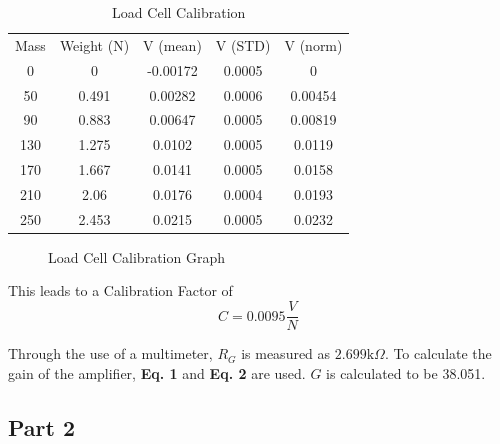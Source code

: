 \documentclass{article}
\begin{document}
\begin{table}
    \centering
    \begin{tabular}{ccccc}
         Mass&  Weight (N)&  V (mean)&  V (STD)&  V (norm)   \\
         0&  0&  -0.00172&  0.0005&  0   \\
         50&  0.491&  0.00282&  0.0006&  0.00454   \\
         90&  0.883&  0.00647&  0.0005&  0.00819   \\
         130&  1.275&  0.0102&  0.0005&  0.0119  \\
 170& 1.667& 0.0141& 0.0005& 0.0158 \\
 210& 2.06& 0.0176& 0.0004& 0.0193 \\
 250& 2.453& 0.0215& 0.0005& 0.0232 \\
    \end{tabular}
    \caption{Load Cell Calibration}
    \label{tab:my_label}
\end{table}

\begin{figure}[H]
    \centering
    \caption{Load Cell Calibration Graph}
    \label{fig:loadcellcalib2}
\end{figure}

This leads to a Calibration Factor of \begin{equation} C = 0.0095 \dfrac{V}{N}\ \end{equation}

Through the use of a multimeter, \(R_{G}\) is measured as \(2.699\text{k}\Omega\).  To calculate the gain of the amplifier, \textbf{Eq. 1} and \textbf{Eq. 2} are used. \(G\) is calculated to be 38.051.
\subsection{Part 2} 
\end{document}
